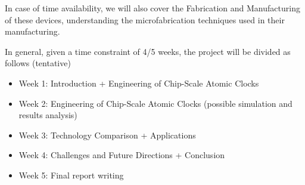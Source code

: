 In case of time availability, we will also cover the Fabrication and Manufacturing of these devices, understanding the microfabrication techniques used in their manufacturing.

In general, given a time constraint of 4/5 weeks, the project will be divided as follows (tentative)

\begin{itemize}
    \item Week 1: Introduction + Engineering of Chip-Scale Atomic Clocks
    \item Week 2: Engineering of Chip-Scale Atomic Clocks (possible simulation and results analysis)
    \item Week 3: Technology Comparison + Applications
    \item Week 4: Challenges and Future Directions + Conclusion
    \item Week 5: Final report writing
\end{itemize}
